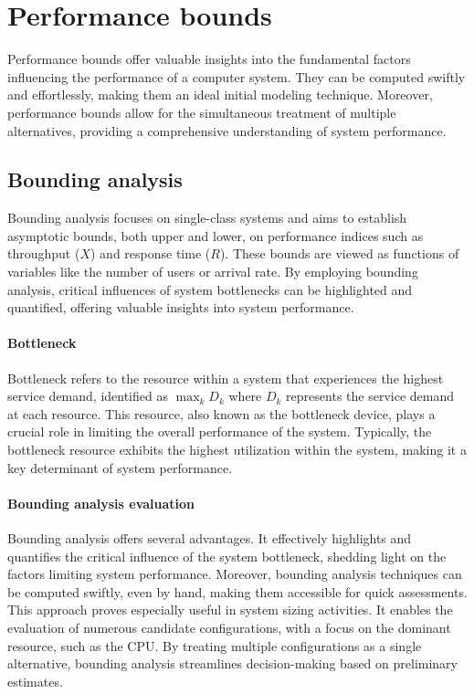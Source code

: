 \section{Performance bounds}

Performance bounds offer valuable insights into the fundamental factors influencing the performance of a computer system. 
They can be computed swiftly and effortlessly, making them an ideal initial modeling technique.
Moreover, performance bounds allow for the simultaneous treatment of multiple alternatives, providing a comprehensive understanding of system performance.

\subsection{Bounding analysis}
Bounding analysis focuses on single-class systems and aims to establish asymptotic bounds, both upper and lower, on performance indices such as throughput ($X$) and response time ($R$). 
These bounds are viewed as functions of variables like the number of users or arrival rate.
By employing bounding analysis, critical influences of system bottlenecks can be highlighted and quantified, offering valuable insights into system performance.

\paragraph*{Bottleneck}
Bottleneck refers to the resource within a system that experiences the highest service demand, identified as $\max_k D_k$ where $D_k$ represents the service demand at each resource.
This resource, also known as the bottleneck device, plays a crucial role in limiting the overall performance of the system. 
Typically, the bottleneck resource exhibits the highest utilization within the system, making it a key determinant of system performance.

\paragraph*{Bounding analysis evaluation}
Bounding analysis offers several advantages. It effectively highlights and quantifies the critical influence of the system bottleneck, shedding light on the factors limiting system performance. 
Moreover, bounding analysis techniques can be computed swiftly, even by hand, making them accessible for quick assessments.
This approach proves especially useful in system sizing activities. 
It enables the evaluation of numerous candidate configurations, with a focus on the dominant resource, such as the CPU. 
By treating multiple configurations as a single alternative, bounding analysis streamlines decision-making based on preliminary estimates.

